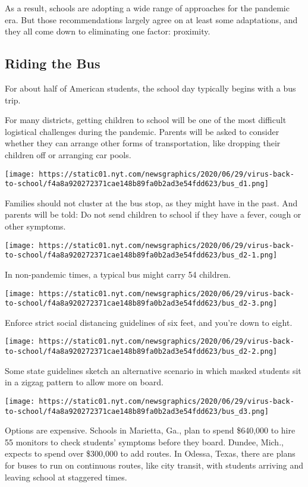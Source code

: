As a result, schools are adopting a wide range of approaches for the
pandemic era. But those recommendations largely agree on at least some
adaptations, and they all come down to eliminating one factor:
proximity.

\hypertarget{riding-the-bus}{%
\subsection{Riding the Bus}\label{riding-the-bus}}

For about half of American students, the school day typically begins
with a bus trip.

For many districts, getting children to school will be one of the most
difficult logistical challenges during the pandemic. Parents will be
asked to consider whether they can arrange other forms of
transportation, like dropping their children off or arranging car pools.

\texttt{[image: https://static01.nyt.com/newsgraphics/2020/06/29/virus-back-to-school/f4a8a920272371cae148b89fa0b2ad3e54fdd623/bus\_d1.png]}

Families should not cluster at the bus stop, as they might have in the
past. And parents will be told: Do not send children to school if they
have a fever, cough or other symptoms.

\texttt{[image: https://static01.nyt.com/newsgraphics/2020/06/29/virus-back-to-school/f4a8a920272371cae148b89fa0b2ad3e54fdd623/bus\_d2-1.png]}

In non-pandemic times, a typical bus might carry 54 children.

\texttt{[image: https://static01.nyt.com/newsgraphics/2020/06/29/virus-back-to-school/f4a8a920272371cae148b89fa0b2ad3e54fdd623/bus\_d2-3.png]}

Enforce strict social distancing guidelines of six feet, and you're down
to eight.

\texttt{[image: https://static01.nyt.com/newsgraphics/2020/06/29/virus-back-to-school/f4a8a920272371cae148b89fa0b2ad3e54fdd623/bus\_d2-2.png]}

Some state guidelines sketch an alternative scenario in which masked
students sit in a zigzag pattern to allow more on board.

\texttt{[image: https://static01.nyt.com/newsgraphics/2020/06/29/virus-back-to-school/f4a8a920272371cae148b89fa0b2ad3e54fdd623/bus\_d3.png]}

Options are expensive. Schools in Marietta, Ga., plan to spend \$640,000
to hire 55 monitors to check students' symptoms before they board.
Dundee, Mich., expects to spend over \$300,000 to add routes. In Odessa,
Texas, there are plans for buses to run on continuous routes, like city
transit, with students arriving and leaving school at staggered times.

